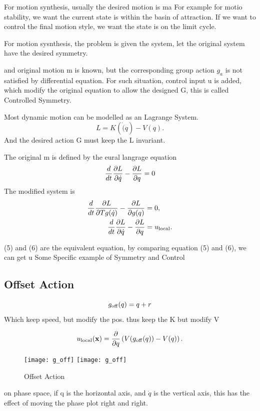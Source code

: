 For motion synthesis, usually the desired motion is ma
For example for motio stability, we want the current state is within the basin of attraction.
If we want to control the final motion style, we want the state is on the limit cycle.

For motion sysnthesis, the problem is given the system, let the original system have the desired symmetry.

 and original motion m is  known, but the corresponding group action $g_a$ is not satisfied by differential equation.
For such situation, control input u  is added, which modify the original equation to allow the designed G, this is called Controlled Symmetry.

Most dynamic motion can be modelled as an Lagrange System. 
\[
L=K(\dot(q)-V(q).
\]
And the desired action G must keep the L invariant. 

The original m is defined by the eural langrage equation
\begin{equation}
\frac{d}{dt} \frac{\partial L}{\partial \dot{q}} - \frac{\partial L}{\partial q} = 0
\label{eq:uncontrolled_euler_lagrange}
\end{equation}
The modified system is 
\begin{align}
\frac{d}{dt} \frac{\partial L}{\partial Tg(\dot{q})} - \frac{\partial L}{\partial g(q)}&=0,\label{eq:liegroup_euler_lagrange}\\
\frac{d}{dt} \frac{\partial L}{\partial \dot{q}} - \frac{\partial L}{\partial q}&=u_{\mathrm{local}}. \label{eq:controlled_euler_lagrange}
\end{align}


(5) and (6) are the equivalent equation, by comparing  equation (5) and (6), we can get u
Some Specific example of Symmetry and Control
\subsection*{ Offset Action}
\[
g_{\mathrm{off}}(q) = q+r
\]
Which keep speed, but modify the pos. thus keep the K but modify V

\begin{equation}
u_{\mathrm{local}}(\mathbf{x}) = \frac{\partial}{\partial q} \left(V(g_{\mathrm{off}}(q)) - V(q)\right).
\end{equation}

\begin{figure}[!htbp]
  \begin{center}
    \leavevmode
    \ifpdf
      \texttt{[image: g\_off]}
    \else
      \texttt{[image: g\_off]}
    \fi
    \caption{Offset Action}
    \label{fig:goff}
\end{center}
\end{figure}
on phase space, if q is the horizontal axis, and $\dot{q}$ is the vertical axis, this has the effect of moving the phase plot right and right.
